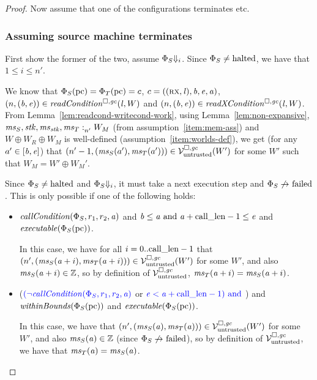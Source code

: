 \documentclass[a4paper]{article}
\begin{document}
\begin{proof}
Now assume that one of the configurations terminates etc.

\subsubsection*{Assuming source machine terminates}
First show the former of the two, assume $\Phi_S\term[i]$.
Since $\Phi_S \neq \halted$, we have that $1 \leq i \leq n'$.

We know that $\Phi_S(\pcreg) = \Phi_T(\pcreg) = c$, $c=((\rx,\lin),\baddr,\eaddr,\aaddr)$, $\npair{(\baddr,\eaddr)}\in \readCond{\lin,W}$ and $\npair{(\baddr,\eaddr)}\in \xReadCond{\lin,W}$.
From Lemma~\ref{lem:readcond-writecond-work}, using Lemma~\ref{lem:non-expansive}, $\memSat[n']{\ms_S,\stk,\ms_\stk,\ms_T}{W_M}$ (from assumption~\ref{item:mem-ass}) and $W \oplus W_R \oplus W_M$ is well-defined (assumption~\ref{item:worlds-def}), we get (for any $a' \in [\baddr,\eaddr]$) that $\npair[n'-1]{(\ms_S(a'),\ms_T(a'))} \in \lrv(W')$ for some $W'$ such that $W_M = W' \oplus W_M'$.

Since $\Phi_S \neq \halted$ and $\Phi_S\term[i]$, it must take a next execution step and $\Phi_S \not\step\failed$. 
This is only possible if one of the following holds:
\begin{itemize}
\item $\callCond{\Phi_S,r_1,r_2,\aaddr}$ and
  $\baddr \leq \aaddr \tand \aaddr + \calllen-1 \leq \eaddr$ and 
  $\exec{\Phi_S(\pcreg)}$.

  In this case, we have for all $i = 0..\calllen-1$ that $\npair[n']{(\ms_S(\aaddr+i),\ms_T(\aaddr+i))} \in \lrv(W')$ for some $W'$, and also $\ms_S(\aaddr+i) \in \ints$, so by definition of $\lrv$, $\ms_T(\aaddr+i) = \ms_S(\aaddr+i)$.
\item ($\src{(\neg\callCond{\Phi_S,r_1,r_2,\aaddr}}$ or $\src{\eaddr < \aaddr + \calllen-1) \tand}$) and
  $\withinBounds{\Phi_S(\pcreg)}$ and $\exec{\Phi_S(\pcreg)}$.

  In this case, we have that $\npair[n']{(\ms_S(\aaddr),\ms_T(\aaddr))} \in \lrv(W')$ for some $W'$, and also $\ms_S(\aaddr) \in \ints$ (since $\Phi_S \not\step\failed$), so by definition of $\lrv$, we have that $\ms_T(\aaddr) = \ms_S(\aaddr)$.
\end{itemize}


\end{proof}
\end{document}
